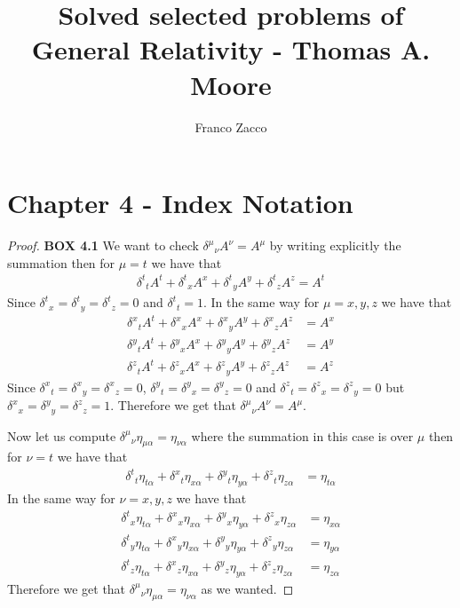 \documentclass[11pt]{article}
\title{\textbf{Solved selected problems of General Relativity - Thomas A. Moore}}
\author{Franco Zacco}
\date{}
\theoremstyle{definition}
\begin{document}
\maketitle
\thispagestyle{empty}

\section*{Chapter 4 - Index Notation}

\begin{proof}{\textbf{BOX 4.1}}
    We want to check ${\delta^\mu}_{\nu}A^\nu = A^\mu$ by writing explicitly
    the summation then for $\mu = t$ we have that
    \begin{align*}
        {\delta^t}_t A^t + {\delta^t}_x A^x + {\delta^t}_y A^y
        + {\delta^t}_z A^z = A^t
    \end{align*}
    Since ${\delta^t}_x = {\delta^t}_y = {\delta^t}_z = 0$ and ${\delta^t}_t = 1$.
    In the same way for $\mu = x,y,z$ we have that
    \begin{align*}
        {\delta^x}_t A^t + {\delta^x}_x A^x + {\delta^x}_y A^y
        + {\delta^x}_z A^z &= A^x\\
        {\delta^y}_t A^t + {\delta^y}_x A^x + {\delta^y}_y A^y
        + {\delta^y}_z A^z &= A^y\\
        {\delta^z}_t A^t + {\delta^z}_x A^x + {\delta^z}_y A^y
        + {\delta^z}_z A^z &= A^z
    \end{align*}
    Since ${\delta^x}_t = {\delta^x}_y = {\delta^x}_z = 0$,
    ${\delta^y}_t = {\delta^y}_x = {\delta^y}_z = 0$ and
    ${\delta^z}_t = {\delta^z}_x = {\delta^z}_y = 0$ but
    ${\delta^x}_x = {\delta^y}_y = {\delta^z}_z = 1$.
    Therefore we get that ${\delta^\mu}_{\nu}A^\nu = A^\mu$.

    Now let us compute ${\delta^\mu}_{\nu}\eta_{\mu\alpha} = \eta_{\nu\alpha}$
    where the summation in this case is over $\mu$
    then for $\nu = t$ we have that
    \begin{align*}
        {\delta^t}_t \eta_{t\alpha} + {\delta^x}_t \eta_{x\alpha}
        + {\delta^y}_t \eta_{y\alpha} + {\delta^z}_t \eta_{z\alpha}
        &= \eta_{t\alpha}
    \end{align*}
    In the same way for $\nu = x,y,z$ we have that
    \begin{align*}
        {\delta^t}_x \eta_{t\alpha} + {\delta^x}_x \eta_{x\alpha}
        + {\delta^y}_x \eta_{y\alpha} + {\delta^z}_x \eta_{z\alpha}
        &= \eta_{x\alpha}\\
        {\delta^t}_y \eta_{t\alpha} + {\delta^x}_y \eta_{x\alpha}
        + {\delta^y}_y \eta_{y\alpha} + {\delta^z}_y \eta_{z\alpha}
        &= \eta_{y\alpha}\\
        {\delta^t}_z \eta_{t\alpha} + {\delta^x}_z \eta_{x\alpha}
        + {\delta^y}_z \eta_{y\alpha} + {\delta^z}_z \eta_{z\alpha}
        &= \eta_{z\alpha}
    \end{align*}
    Therefore we get that ${\delta^\mu}_{\nu}\eta_{\mu\alpha} = \eta_{\nu\alpha}$
    as we wanted.
\end{proof}
\end{document}
